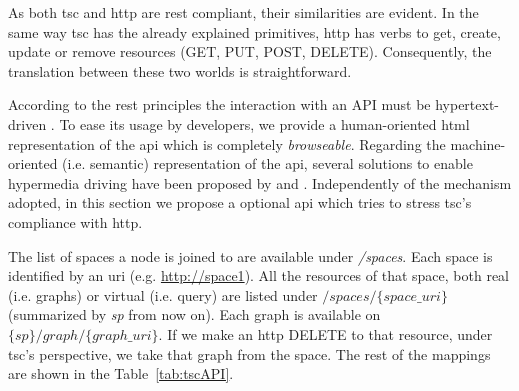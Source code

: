As both \ac{tsc} and \ac{http} are \ac{rest} compliant, their similarities are evident.
In the same way \ac{tsc} has the already explained primitives, \ac{http} has verbs to get, create, update or remove resources (GET, PUT, POST, DELETE).
Consequently, the translation between these two worlds is straightforward.

\begin{sloppypar}
According to the \ac{rest} principles the interaction with an API must be hypertext-driven \citep{fielding_rest_2008}.
To ease its usage by developers, we provide a human-oriented \acs{html} representation of the \ac{api} which is completely \emph{browseable}.
Regarding the machine-oriented (i.e. semantic) representation of the \ac{api}, several solutions to enable hypermedia driving have been proposed by \citet{verborgh_functional_2012} and \citet{kjernsmo_necessity_2012}. %
Independently of the mechanism adopted, in this section we propose a optional \ac{api} which tries to stress \ac{tsc}'s compliance with \ac{http}.
\end{sloppypar}

The list of spaces a node is joined to are available under \textit{/spaces}.
Each space is identified by an \acs{uri} (e.g. \url{http://space1}).
All the resources of that space, both real (i.e. graphs) or virtual (i.e. query) are listed under $/spaces/\{space\_uri\}$ (summarized by \emph{sp} from now on).
Each graph is available on ${\{sp\}/graph/\{graph\_uri\}}$.
If we make an \acs{http} DELETE to that resource, under \ac{tsc}'s perspective, we take that graph from the space.
The rest of the mappings are shown in the Table~\ref{tab:tscAPI}.

